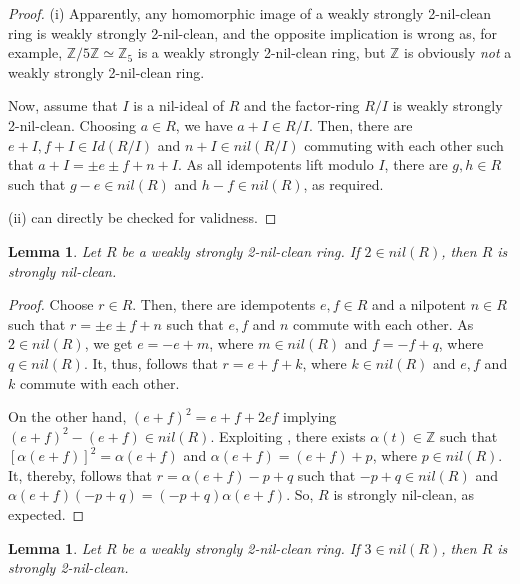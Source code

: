 \documentclass[12pt]{amsart}
\newtheorem{lemma}[theorem]{Lemma}
\theoremstyle{definition}
\begin{document}
\begin{proof} (i) Apparently, any homomorphic image of a weakly strongly 2-nil-clean ring is weakly strongly 2-nil-clean, and the opposite implication is wrong as, for example, $\mathbb{Z}/5\mathbb{Z}\simeq \mathbb{Z}_5$ is a weakly strongly 2-nil-clean ring, but $\mathbb{Z}$ is obviously {\it not} a weakly strongly 2-nil-clean ring.

Now, assume that $I$ is a nil-ideal of $R$ and the factor-ring $R/I$ is weakly strongly 2-nil-clean. Choosing $a\in R$, we have $a+I\in R/I$. Then, there are $e+I,f+I\in Id(R/I)$ and $n+I\in nil(R/I)$ commuting with each other such that $a+I=\pm e\pm f+n+I$. As all idempotents lift modulo $I$, there are $g,h\in R$ such that $g-e\in nil(R)$ and $h-f\in nil(R)$, as required.

(ii) can directly be checked for validness.
\end{proof}

\begin{lemma}\label{2} Let $R$ be a weakly strongly 2-nil-clean ring. If $2\in nil(R)$, then $R$ is strongly nil-clean.
\end{lemma}

\begin{proof} Choose $r\in R$. Then, there are idempotents $e,f\in R$ and a nilpotent $n\in R$ such that $r=\pm e\pm f+n$ such that $e,f$ and $n$ commute with each other. As $2\in nil(R)$, we get $e=-e+m$, where $m\in nil(R)$ and $f=-f+q$, where $q\in nil(R)$. It, thus, follows that $r=e+f+k$, where $k\in nil(R)$ and $e,f$ and $k$ commute with each other.

On the other hand, $(e+f)^2=e+f+2ef$ implying $(e+f)^2-(e+f)\in nil(R)$. Exploiting \cite[Lemma 2.4]{zhou}, there exists $\alpha(t)\in \mathbb{Z}$ such that $[\alpha(e+f)]^2=\alpha(e+f)$ and $\alpha(e+f)=(e+f)+p$, where $p\in nil(R)$. It, thereby, follows that $r=\alpha(e+f)-p+q$ such that $-p+q\in nil(R)$ and $\alpha(e+f)(-p+q)=(-p+q)\alpha(e+f)$. So, $R$ is strongly nil-clean, as expected.
\end{proof}

\begin{lemma}\label{3} Let $R$ be a weakly strongly 2-nil-clean ring. If $3\in nil(R)$, then $R$ is strongly 2-nil-clean.
\end{lemma}
\end{document}
